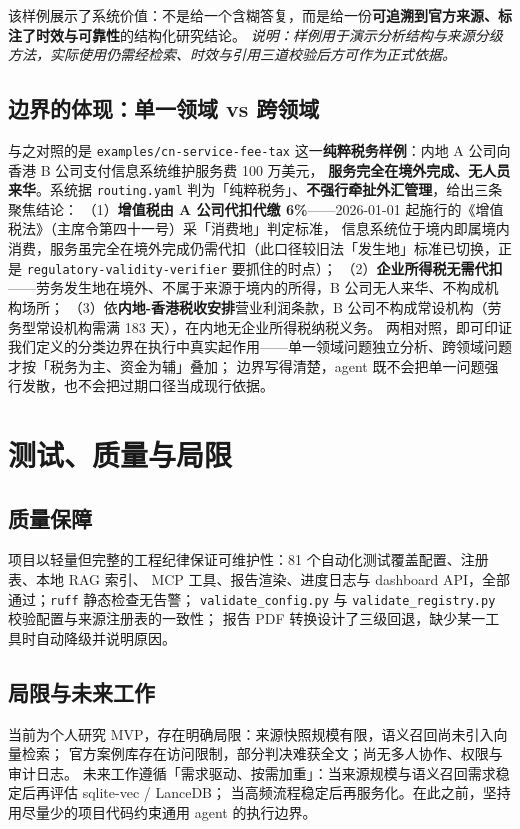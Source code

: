 \documentclass[a4paper,11pt]{ctexart}
\newcommand{\note}[1]{{\small\itshape #1}}
\newcommand{\id}[1]{\texttt{#1}}
\begin{document}
该样例展示了系统价值：不是给一个含糊答复，而是给一份\textbf{可追溯到官方来源、标注了时效与可靠性}的结构化研究结论。
\note{说明：样例用于演示分析结构与来源分级方法，实际使用仍需经检索、时效与引用三道校验后方可作为正式依据。}

\subsection{边界的体现：单一领域 vs 跨领域}
与之对照的是 \id{examples/cn-service-fee-tax} 这一\textbf{纯粹税务样例}：内地 A 公司向香港 B 公司支付信息系统维护服务费 100 万美元，
\textbf{服务完全在境外完成、无人员来华}。系统据 \id{routing.yaml} 判为「纯粹税务」、\textbf{不强行牵扯外汇管理}，给出三条聚焦结论：
（1）\textbf{增值税由 A 公司代扣代缴 6\%}——2026-01-01 起施行的《增值税法》（主席令第四十一号）采「消费地」判定标准，
信息系统位于境内即属境内消费，服务虽完全在境外完成仍需代扣（此口径较旧法「发生地」标准已切换，正是 \id{regulatory-validity-verifier} 要抓住的时点）；
（2）\textbf{企业所得税无需代扣}——劳务发生地在境外、不属于来源于境内的所得，B 公司无人来华、不构成机构场所；
（3）依\textbf{内地-香港税收安排}营业利润条款，B 公司不构成常设机构（劳务型常设机构需满 183 天），在内地无企业所得税纳税义务。
两相对照，即可印证我们定义的分类边界在执行中真实起作用——单一领域问题独立分析、跨领域问题才按「税务为主、资金为辅」叠加；
边界写得清楚，agent 既不会把单一问题强行发散，也不会把过期口径当成现行依据。

\section{测试、质量与局限}

\subsection{质量保障}
项目以轻量但完整的工程纪律保证可维护性：81 个自动化测试覆盖配置、注册表、本地 RAG 索引、
MCP 工具、报告渲染、进度日志与 dashboard API，全部通过；\id{ruff} 静态检查无告警；
\id{validate\_config.py} 与 \id{validate\_registry.py} 校验配置与来源注册表的一致性；
报告 PDF 转换设计了三级回退，缺少某一工具时自动降级并说明原因。

\subsection{局限与未来工作}
当前为个人研究 MVP，存在明确局限：来源快照规模有限，语义召回尚未引入向量检索；
官方案例库存在访问限制，部分判决难获全文；尚无多人协作、权限与审计日志。
未来工作遵循「需求驱动、按需加重」：当来源规模与语义召回需求稳定后再评估 sqlite-vec / LanceDB；
当高频流程稳定后再服务化。在此之前，坚持用尽量少的项目代码约束通用 agent 的执行边界。
\end{document}
